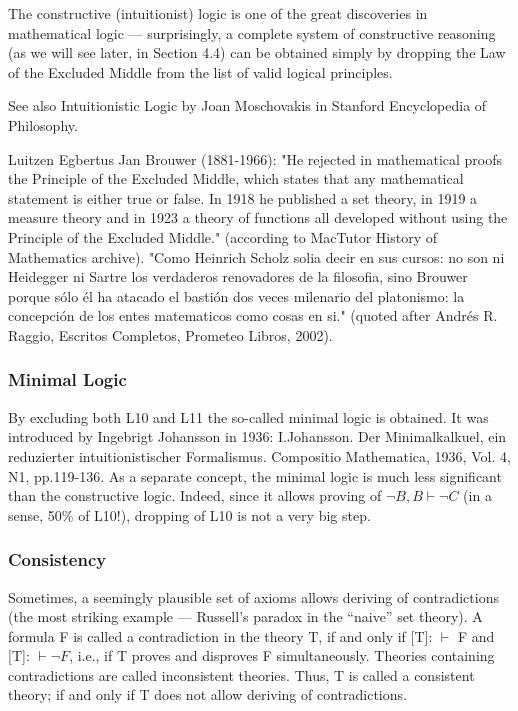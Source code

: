 The constructive (intuitionist) logic is one of the great discoveries in mathematical logic --- surprisingly, a complete system of constructive reasoning (as we will see later, in Section 4.4) can be obtained simply by dropping the Law of the Excluded Middle from the list of valid logical principles.

See also Intuitionistic Logic by Joan Moschovakis in Stanford Encyclopedia of Philosophy.

Luitzen Egbertus Jan Brouwer (1881-1966): "He rejected in mathematical proofs the Principle of the Excluded Middle, which states that any mathematical statement is either true or false. In 1918 he published a set theory, in 1919 a measure theory and in 1923 a theory of functions all developed without using the Principle of the Excluded Middle." (according to MacTutor History of Mathematics archive). "Como Heinrich Scholz solia decir en sus cursos: no son ni Heidegger ni Sartre los verdaderos renovadores de la filosofia, sino Brouwer porque sólo él ha atacado el bastión dos veces milenario del platonismo: la concepción de los entes matematicos como cosas en si." (quoted after Andrés R. Raggio, Escritos Completos, Prometeo Libros, 2002).

\subsubsection{Minimal Logic}

By excluding both L10 and L11 the so-called minimal logic is obtained. It was introduced by Ingebrigt Johansson in 1936: I.Johansson. Der Minimalkalkuel, ein reduzierter intuitionistischer Formalismus. Compositio Mathematica, 1936, Vol. 4, N1, pp.119-136.  As a separate concept, the minimal logic is much less significant than the constructive logic. Indeed, since it allows proving of \(\neg B, B \vdash \neg C\) (in a sense, 50\% of L10!), dropping of L10 is not a very big step.

\subsubsection{Consistency}

Sometimes, a seemingly plausible set of axioms allows deriving of contradictions (the most striking example --- Russell's paradox in the ``naive'' set theory). A formula F is called a contradiction in the theory T, if and only if [T]: \(\vdash\) F and [T]: \(\vdash \neg F\), i.e., if T proves and disproves F simultaneously. Theories containing contradictions are called inconsistent theories. Thus, T is called a consistent theory; if and only if T does not allow deriving of contradictions.

